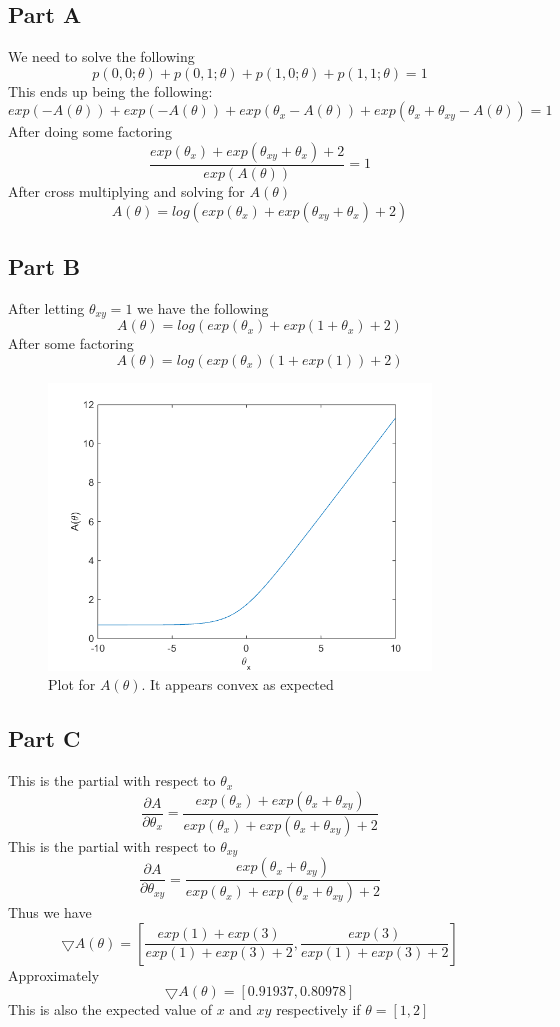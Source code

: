\documentclass[twoside,11pt]{article}
\theoremstyle{definition}
\begin{document}
\subsection*{Part A}

We need to solve the following
\[
p(0,0;\theta) + p(0,1;\theta) + p(1,0;\theta) + p(1,1;\theta) = 1
\]
This ends up being the following:
\[
exp(-A(\theta)) + exp(-A(\theta)) + exp(\theta_x - A(\theta)) + exp(\theta_x + \theta_{xy} - A(\theta)) = 1
\]
After doing some factoring
\[
\frac{exp(\theta_x) + exp(\theta_{xy} + \theta_x) + 2}{exp(A(\theta))} = 1
\]
After cross multiplying and solving for $A(\theta)$
\[
A(\theta) = log( exp(\theta_x) + exp(\theta_{xy} + \theta_x) + 2 )
\]

\subsection*{Part B}
After letting $\theta_{xy} = 1$ we have the following
\[
A(\theta) = log( exp(\theta_x) + exp(1 + \theta_x) + 2 )
\]
After some factoring
\[
A(\theta) = log( exp(\theta_x)(1 + exp(1) ) + 2 )
\]
\begin{figure}[h]
\centering
\includegraphics[width=4in]{prob3bplot.png}
\caption{Plot for $A(\theta)$. It appears convex as expected}
\end{figure}

\subsection*{Part C}
This is the partial with respect to $\theta_x$
\[
\frac{\partial A}{\partial \theta_x} = \frac{exp(\theta_x) + exp(\theta_x + \theta_{xy})}{exp(\theta_x) + exp(\theta_x + \theta_{xy}) + 2}
\]
This is the partial with respect to $\theta_{xy}$
\[
\frac{\partial A}{\partial \theta_{xy}} = \frac{exp(\theta_x + \theta_{xy})}{exp(\theta_x) + exp(\theta_x + \theta_{xy}) + 2}
\]
Thus we have 
\[
\bigtriangledown A(\theta) = [\frac{exp(1)+exp(3)}{exp(1)+exp(3)+2},\frac{exp(3)}{exp(1)+exp(3)+2}]
\]
Approximately 
\[
\bigtriangledown A(\theta) = [0.91937,0.80978]
\]
This is also the expected value of $x$ and $xy$ respectively if $\theta=[1,2]$
\end{document}
